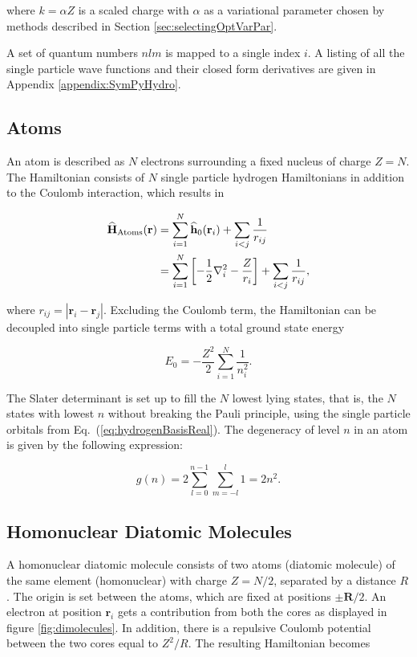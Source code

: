 where $k = \alpha Z$ is a scaled charge with $\alpha$ as a variational parameter chosen by methods described in Section \ref{sec:selectingOptVarPar}.

A set of quantum numbers $nlm$ is mapped to a single index $i$. A listing of all the single particle wave functions and their closed form derivatives are given in Appendix \ref{appendix:SymPyHydro}.

\subsection{Atoms}

An atom is described as $N$ electrons surrounding a fixed nucleus of charge $Z=N$. The Hamiltonian consists of $N$ single particle hydrogen Hamiltonians in addition to the Coulomb interaction, which results in

\begin{align}
 {\bf\widehat{H}}_{\mathrm{Atoms}}(\mathbf{r}) &= \sum_{i=1}^N {\bf\widehat{h}}_0(\mathbf{r}_i) + \sum_{i<j} \frac{1}{r_{ij}} \\
                         &= \sum_{i=1}^N \left[-\frac{1}{2}\nabla_i^2 - \frac{Z}{r_i}\right] + \sum_{i<j} \frac{1}{r_{ij}},
\end{align}

where $r_{ij} = |\mathbf{r}_i -\mathbf{r}_j|$. Excluding the Coulomb term, the Hamiltonian can be decoupled into single particle terms with a total ground state energy

\begin{equation}
 E_0 = -\frac{Z^2}{2}\sum_{i=1}^N \frac{1}{n_i^2}. \label{eq:atomsE0}
\end{equation}

The Slater determinant is set up to fill the $N$ lowest lying states, that is, the $N$ states with lowest $n$ without breaking the Pauli principle, using the single particle orbitals from Eq.~(\ref{eq:hydrogenBasisReal}). The degeneracy of level $n$ in an atom is given by the following expression:

\begin{equation}
g(n) = 2\sum_{l=0}^{n-1}\sum_{m={-l}}^l 1 = 2n^2. 
\end{equation}

\subsection{Homonuclear Diatomic Molecules}
\label{sec:homoMolecules}

A homonuclear diatomic molecule consists of two atoms (diatomic molecule) of the same element (homonuclear) with charge $Z=N/2$, separated by a distance $R$. The origin is set between the atoms, which are fixed at positions $\pm \mathbf{R}/2$. An electron at position $\mathbf{r}_i$ gets a contribution from both the cores as displayed in figure \ref{fig:dimolecules}. In addition, there is a repulsive Coulomb potential between the two cores equal to $Z^2/R$. The resulting Hamiltonian becomes

